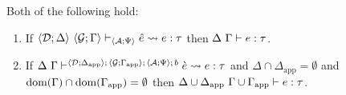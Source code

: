 \begingroup
\def\thetheorem{\ref{thm:typed-expansion-full-U}}
\begin{theorem} Both of the following hold:
\begin{enumerate}
\item If $\langle \mathcal{D}; \Delta \rangle~\langle \mathcal{G}; \Gamma \rangle \vdash_{\langle \mathcal{A}; \Psi \rangle} {\hat e} \leadsto e : \tau$ then $\Delta~\Gamma \vdash e : \tau$.
\item If $\Delta~\Gamma\vdash^{\langle \mathcal{D}; \Delta_\text{app} \rangle;\,\langle \mathcal{G}; \Gamma_\text{app} \rangle;\,\langle \mathcal{A}; \Psi \rangle;\,b} \grave{e} \leadsto e : \tau$ and $\Delta \cap \Delta_\text{app} = \emptyset$ and $\text{dom}(\Gamma) \cap \text{dom}(\Gamma_\text{app}) = \emptyset$ then ${\Delta}\cup{\Delta_\text{app}}~{\Gamma}\cup{\Gamma_\text{app}} \vdash e : \tau$.
\end{enumerate}
\end{theorem}
\endgroup

